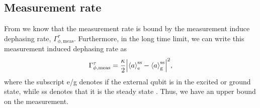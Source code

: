 \subsection{Measurement rate}
From \textcite{Clerk:2010} we know that the measurement rate is bound by the measurement induce dephasing rate, $\Gamma_{\phi, \text{meas}}^\tau$. Furthermore, in the long time limit, we can write this measurement induced dephasing rate as
\begin{equation}
    \Gamma_{\phi, \text{meas}}^\tau = \frac{\kappa}{2} \abs{\expval{a}_\text{e}^\text{ss} - \expval{a}_\text{g}^\text{ss}}^2,
\end{equation}
where the subscript e/g denotes if the external qubit is in the excited or ground state, while ss denotes that it is the steady state \cite{Blais:2021}. Thus, we have an upper bound on the measurement.